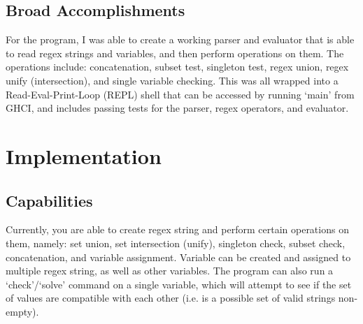 \documentclass[letterpaper, 11pt]{article}
\begin{document}
\subsection{Broad Accomplishments}\label{sec:accomplications}
For the program, I was able to create a working parser and evaluator that is able to read regex strings and variables, and then perform operations on them.
The operations include: concatenation, subset test, singleton test, regex union, regex unify (intersection), and single variable checking.
This was all wrapped into a Read-Eval-Print-Loop (REPL) shell that can be accessed by running `main' from GHCI, and includes passing tests for the parser, regex operators, and evaluator. 


\section{Implementation}\label{sec:impl}

\subsection{Capabilities}\label{sec:capabilities}
Currently, you are able to create regex string and perform certain operations on them, namely: set union, set intersection (unify), singleton check, subset check, concatenation, and variable assignment.
Variable can be created and assigned to multiple regex string, as well as other variables. 
The program can also run a `check'/`solve' command on a single variable, which will attempt to see if the set of values are compatible with each other (i.e. is a possible set of valid strings non-empty). 
\end{document}
